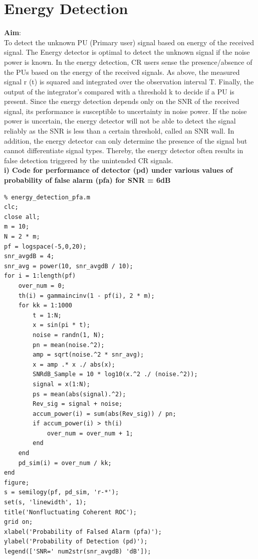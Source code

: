 \documentclass[a4paper]{article}
\begin{document}
\section{Energy Detection}
\textbf{\large{Aim}}:\\[10pt]
To detect the unknown PU (Primary user) signal based on energy of the
received signal. The Energy detector is optimal to detect the unknown signal
if the noise power is known. In the energy detection, CR users sense the
presence/absence of the PUs based on the energy of the received signals. As
above, the measured signal r (t) is squared and integrated over the observation
interval T. Finally, the output of the integrator’s compared with a threshold k
to decide if a PU is present. Since the energy detection depends only on the
SNR of the received signal, its performance is susceptible to uncertainty in
noise power. If the noise power is uncertain, the energy detector will not be
able to detect the signal reliably as the SNR is less than a certain threshold,
called an SNR wall. In addition, the energy detector can only determine
the presence of the signal but cannot differentiate signal types. Thereby, the
energy detector often results in false detection triggered by the unintended CR
signals.\\[10pt]
\textbf{i) Code for performance of detector (pd) under various values of probability
of false alarm (pfa) for SNR = 6dB}\\
\begin{verbatim}
% energy_detection_pfa.m
clc;
close all;
m = 10;
N = 2 * m;
pf = logspace(-5,0,20);
snr_avgdB = 4;
snr_avg = power(10, snr_avgdB / 10);
for i = 1:length(pf)
    over_num = 0;
    th(i) = gammaincinv(1 - pf(i), 2 * m);
    for kk = 1:1000
        t = 1:N;
        x = sin(pi * t);
        noise = randn(1, N);
        pn = mean(noise.^2);
        amp = sqrt(noise.^2 * snr_avg);
        x = amp .* x ./ abs(x);
        SNRdB_Sample = 10 * log10(x.^2 ./ (noise.^2));
        signal = x(1:N);
        ps = mean(abs(signal).^2);
        Rev_sig = signal + noise;
        accum_power(i) = sum(abs(Rev_sig)) / pn;
        if accum_power(i) > th(i)
            over_num = over_num + 1;
        end
    end
    pd_sim(i) = over_num / kk;
end
figure;
s = semilogy(pf, pd_sim, 'r-*');
set(s, 'linewidth', 1);
title('Nonfluctuating Coherent ROC');
grid on;
xlabel('Probability of Falsed Alarm (pfa)');
ylabel('Probability of Detection (pd)');
legend(['SNR=' num2str(snr_avgdB) 'dB']);
\end{verbatim}
\end{document}
